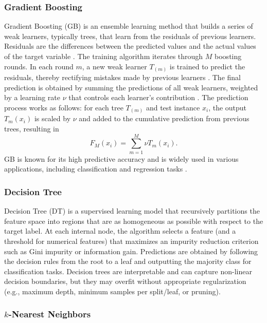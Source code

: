 \subsubsection{Gradient Boosting}

Gradient Boosting (GB) is an ensemble learning method that builds a series of weak learners, typically trees, that learn from the residuals of previous learners. Residuals are the differences between the predicted values and the actual values of the target variable \cite{Chen2024}. The training algorithm iterates through $M$ boosting rounds. In each round $m$, a new weak learner $T_{(m)}$ is trained to predict the residuals, thereby rectifying mistakes made by previous learners \cite{Chen2024}. The final prediction is obtained by summing the predictions of all weak learners, weighted by a learning rate $\nu$ that controls each learner's contribution \cite{Friedman2001}. The prediction process works as follows: for each tree $T_{(m)}$ and test instance $x_i$, the output $T_m(x_i)$ is scaled by $\nu$ and added to the cumulative prediction from previous trees, resulting in
\[
	F_M(x_i) = \sum_{m=1}^M \nu T_m(x_i). 
\]
GB is known for its high predictive accuracy and is widely used in various applications, including classification and regression tasks \cite{Friedman2001}.

\subsubsection{Decision Tree}

Decision Tree (DT) is a supervised learning model that recursively partitions the feature space into regions that are as homogeneous as possible with respect to the target label. At each internal node, the algorithm selects a feature (and a threshold for numerical features) that maximizes an impurity reduction criterion such as Gini impurity or information gain. Predictions are obtained by following the decision rules from the root to a leaf and outputting the majority class for classification tasks. Decision trees are interpretable and can capture non-linear decision boundaries, but they may overfit without appropriate regularization (e.g., maximum depth, minimum samples per split/leaf, or pruning).

\subsubsection{$k$-Nearest Neighbors}


